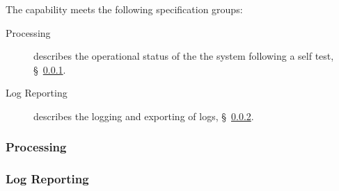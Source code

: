 The \ThisSys capability meets the following specification groups:

\begin{description}
	\item [\BIT Processing] describes the operational status of the the system following a self test, \S~\ref{loc:CAP_BIT_Processing}.
	\item [\BIT Log Reporting] describes the logging and exporting of \BIT logs, \S~\ref{loc:CAP_BIT_Log}.
\end{description}

\renewcommand{\ThisSegment}{Capability One\xspace}%

\KNEADSUBSUBSECTIONNEWPAGE
\subsubsection{\BIT Processing}
\label{loc:CAP_BIT_Processing}




\KNEADSUBSUBSECTIONNEWPAGE
\subsubsection{\BIT Log Reporting}
\label{loc:CAP_BIT_Log}

